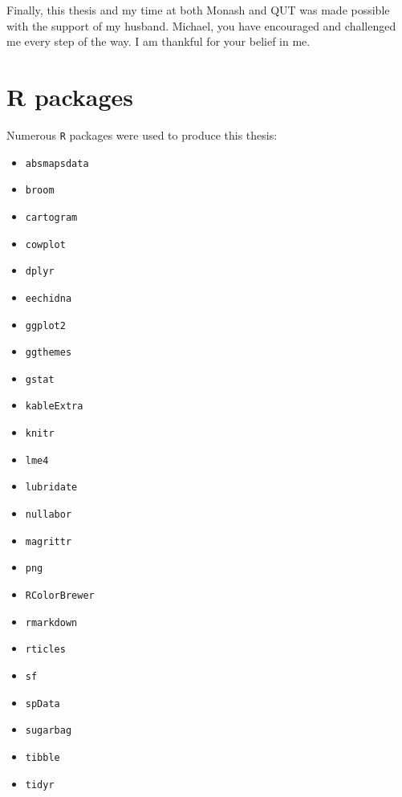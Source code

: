 \documentclass{monashthesis}
\begin{document}
Finally, this thesis and my time at both Monash and QUT was made possible with the support of my husband. Michael, you have encouraged and challenged me every step of the way. I am thankful for your belief in me.

\hypertarget{r-packages}{%
\section*{R packages}\label{r-packages}}

Numerous \texttt{R} \autocite{R} packages were used to produce this thesis:

\begin{itemize}
\tightlist
\item
  \texttt{absmapsdata} \autocite{ABSmaps}
\item
  \texttt{broom} \autocite{broom}
\item
  \texttt{cartogram} \autocite{cartogram}
\item
  \texttt{cowplot} \autocite{cowplot}
\item
  \texttt{dplyr} \autocite{dplyr}
\item
  \texttt{eechidna} \autocite{eechidna}
\item
  \texttt{ggplot2} \autocite{ggplot2}
\item
  \texttt{ggthemes} \autocite{ggthemes}
\item
  \texttt{gstat} \autocite{gstat}
\item
  \texttt{kableExtra} \autocite{kableExtra}
\item
  \texttt{knitr} \autocite{knitr}
\item
  \texttt{lme4} \autocite{lme4}
\item
  \texttt{lubridate} \autocite{lubridate}
\item
  \texttt{nullabor} \autocite{nullabor}
\item
  \texttt{magrittr} \autocite{magrittr}
\item
  \texttt{png} \autocite{png}
\item
  \texttt{RColorBrewer} \autocite{RColorBrewer}
\item
  \texttt{rmarkdown} \autocite{rmarkdown}
\item
  \texttt{rticles} \autocite{rticles}
\item
  \texttt{sf} \autocite{sf}
\item
  \texttt{spData} \autocite{spData}
\item
  \texttt{sugarbag} \autocite{sugarbag}
\item
  \texttt{tibble} \autocite{tibble}
\item
  \texttt{tidyr} \autocite{tibble}
\end{itemize}
\end{document}
